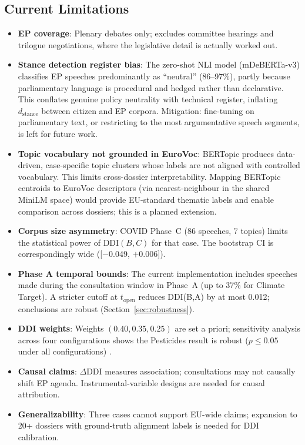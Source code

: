 \documentclass[sigconf,natbib]{acmart}
\begin{document}
\subsection{Current Limitations}
\begin{itemize}
  \item \textbf{EP coverage}: Plenary debates only; excludes committee hearings and trilogue negotiations, where the legislative detail is actually worked out.

  \item \textbf{Stance detection register bias}: The zero-shot NLI model (mDeBERTa-v3) classifies EP speeches predominantly as ``neutral'' (86--97\%), partly because parliamentary language is procedural and hedged rather than declarative. This conflates genuine policy neutrality with technical register, inflating $d_{\text{stance}}$ between citizen and EP corpora. Mitigation: fine-tuning on parliamentary text, or restricting to the most argumentative speech segments, is left for future work.

  \item \textbf{Topic vocabulary not grounded in EuroVoc}: BERTopic produces data-driven, case-specific topic clusters whose labels are not aligned with controlled vocabulary. This limits cross-dossier interpretability. Mapping BERTopic centroids to EuroVoc descriptors (via nearest-neighbour in the shared MiniLM space) would provide EU-standard thematic labels and enable comparison across dossiers; this is a planned extension.

  \item \textbf{Corpus size asymmetry}: COVID Phase~C (86 speeches, 7 topics) limits the statistical power of $\text{DDI}(B, C)$ for that case. The bootstrap CI is correspondingly wide ([$-$0.049, $+$0.006]).

  \item \textbf{Phase A temporal bounds}: The current implementation includes speeches made during the consultation window in Phase~A (up to 37\% for Climate Target). A stricter cutoff at $t_{\text{open}}$ reduces DDI(B,A) by at most 0.012; conclusions are robust (Section~\ref{sec:robustness}).

  \item \textbf{DDI weights}: Weights $(0.40, 0.35, 0.25)$ are set a priori; sensitivity analysis across four configurations shows the Pesticides result is robust ($p \leq 0.05$ under all configurations) \citep{OECD2008}.

  \item \textbf{Causal claims}: $\Delta$DDI measures association; consultations may not causally shift EP agenda. Instrumental-variable designs are needed for causal attribution.

  \item \textbf{Generalizability}: Three cases cannot support EU-wide claims; expansion to 20+ dossiers with ground-truth alignment labels is needed for DDI calibration.
\end{itemize}
\end{document}
